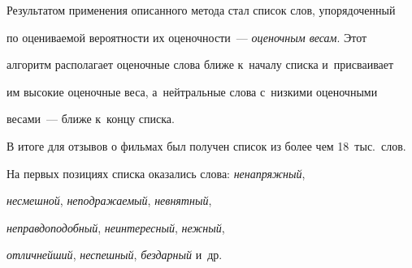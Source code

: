 Результатом применения описанного метода стал список слов, упорядоченный


по оцениваемой вероятности их оценочности~--- \textit{оценочным весам}. Этот


алгоритм располагает оценочные слова ближе к~началу списка и~присваивает


им высокие оценочные веса, а~нейтральные слова с~низкими оценочными


весами~--- ближе к~концу списка.





В итоге для отзывов о фильмах был получен список из более чем 18~тыс.\ слов.


На первых позициях списка оказались слова: \textit{ненапряжный},


\textit{несмешной}, \textit{неподражаемый}, \textit{невнятный},


\textit{неправдоподобный}, \textit{неинтересный}, \textit{нежный},


\textit{отличнейший}, \textit{неспешный}, \textit{бездарный} и~др.





